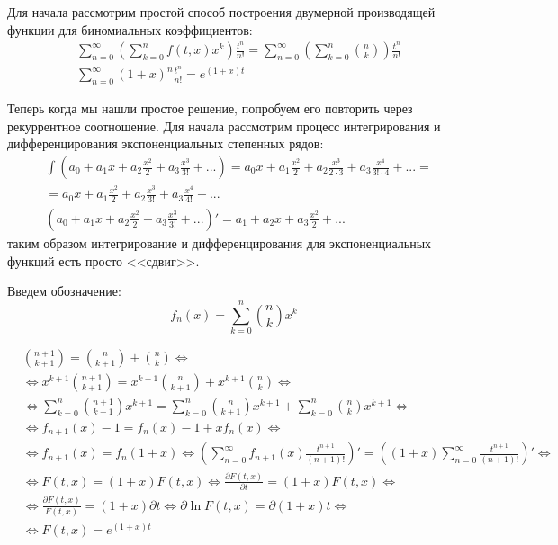 \documentclass[a4paper,12pt]{article}
\begin{document}
\begin{Solution}
Для начала рассмотрим простой способ построения двумерной производящей функции для биномиальных коэффициентов:
\[
	\begin{split}
		&\sum_{n=0}^{\infty}\left(\sum_{k=0}^n f\left(t,x\right) x^k\right) \frac{t^n}{n!} = \sum_{n=0}^{\infty}\left(\sum_{k=0}^n \binom{n}{k} \right) \frac{t^n}{n!} \\
		&\sum_{n=0}^{\infty}\left(1+x\right)^n \frac{t^n}{n!} = e^{\left(1+x\right)t}
	\end{split}
\]

Теперь когда мы нашли простое решение, попробуем его повторить через рекуррентное соотношение. Для начала рассмотрим процесс интегрирования и дифференцирования экспоненциальных степенных рядов:
\[
	\begin{split}
		& \int{\left(a_0 + a_1 x + a_2 \frac{x^2}{2} + a_3 \frac{x^3}{3!} + ... \right)} = a_0 x + a_1 \frac{x^2}{2} + a_2 \frac{x^3}{2 \cdot 3} + a_3 \frac{x^4}{3! \cdot 4} + ... = \\
		& = a_0 x + a_1 \frac{x^2}{2} + a_2 \frac{x^3}{3!} + a_3 \frac{x^4}{4!} + ... \\
		& \left(a_0 + a_1 x + a_2 \frac{x^2}{2} + a_3 \frac{x^3}{3!} + ... \right)' = a_1 + a_2 x + a_3 \frac{x^2}{2} + ...
	\end{split}
\]
таким образом интегрирование и дифференцирования для экспоненциальных функций есть просто <<сдвиг>>.

Введем обозначение:
\[
	f_{n} \left(x\right) = \sum_{k=0}^n \binom{n}{k} x^k
\]

\[
	\begin{split}
		& \binom{n+1}{k+1} = \binom{n}{k+1} + \binom{n}{k} \Leftrightarrow \\
		& \Leftrightarrow x^{k+1} \binom{n+1}{k+1} = x^{k+1} \binom{n}{k+1} + x^{k+1} \binom{n}{k} \Leftrightarrow \\
		& \Leftrightarrow \sum_{k=0}^{n} \binom{n+1}{k+1} x^{k+1} = \sum_{k=0}^{n} \binom{n}{k+1} x^{k+1} + \sum_{k=0}^{n} \binom{n}{k} x^{k+1} \Leftrightarrow \\
		& \Leftrightarrow f_{n+1} \left(x\right) - 1 = f_{n}\left(x\right) - 1 + x f_{n} \left(x\right) \Leftrightarrow \\
		& \Leftrightarrow f_{n+1}\left(x\right) = f_{n}\left(1+x\right) \Leftrightarrow \left(\sum_{n=0}^{\infty} f_{n+1}\left(x\right) \frac{t^{n+1}}{\left(n+1\right)!}\right)' = \left(\left(1+x\right) \sum_{n=0}^{\infty} \frac{t^{n+1}}{\left(n+1\right)!}\right)' \Leftrightarrow \\
		& \Leftrightarrow F\left(t, x\right) = \left(1+x\right) F\left(t, x\right) \Leftrightarrow \frac{\partial F \left(t,x\right)}{\partial t} = \left(1+x\right) F\left(t,x\right) \Leftrightarrow \\
		& \Leftrightarrow \frac{\partial F\left(t,x\right)}{F\left(t,x\right)} = \left(1+x\right) \partial t \Leftrightarrow \partial \ln{F\left(t, x\right)} = \partial \left(1+x\right)t \Leftrightarrow \\
		& \Leftrightarrow F\left(t,x\right) = e^{\left(1+x\right)t}
	\end{split}
\]


\end{Solution}
\end{document}
